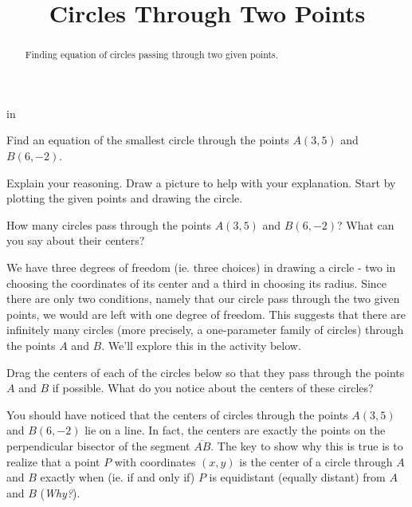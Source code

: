 \documentclass{ximera}
\title{Circles Through Two Points}
\newcommand{\pskip}{\vskip 0.1 in}
\begin{document}
\begin{abstract}
Finding equation of circles passing through two given points.
\end{abstract}
\maketitle


\pskip

\begin{question}\label{QLDF3efr}
Find an equation of the smallest circle through the points $A(3,5)$ and $B(6,-2)$. 

Explain your reasoning. Draw a picture to help with your explanation. Start by plotting the given points and drawing the circle.
\end{question}

\begin{example}  \label{Ex5sdfdsfdsf}
How many circles pass through the points $A(3,5)$ and $B(6,-2)$? What can you say about their centers?

\begin{explanation}
We have three degrees of freedom (ie. three choices) in drawing a circle - two in choosing the coordinates of its center and a third in choosing its radius. Since there are only two conditions, namely that our circle pass through the two given points, we would are left with one degree of freedom. This suggests that there are infinitely many circles (more precisely, a one-parameter family of circles) through the points $A$ and $B$. We'll explore this in the activity below. 


Drag the centers of each of the circles below so that they pass through the points $A$ and $B$ if possible. What do you notice about the centers of these circles?
 
 
\begin{onlineOnly}
    \begin{center}
\end{center}
\end{onlineOnly}


You should have noticed that the centers of circles through the points $A(3,5)$ and $B(6,-2)$ lie on a line. In fact, the centers are exactly the points on the perpendicular bisector of the segment $\overline{AB}$. The key to show why this is true is to realize that a point $P$ with coordinates $(x,y)$ is the center of a circle through $A$ and $B$ exactly when (ie. if and only if) $P$ is equidistant (equally distant) from $A$ and $B$ (\emph{Why?}). 


\end{explanation}
\end{example}
\end{document}
